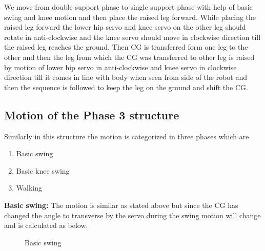 \documentclass[12pt]{article}
\begin{document}
We move from double support phase to single support phase with help of basic swing and
knee motion and then place the raised leg forward. While placing the raised leg forward
the lower hip servo and knee servo on the other leg should rotate in anti-clockwise and the
knee servo should move in clockwise direction till the raised leg reaches the ground. Then
CG is transferred form one leg to the other and then the leg from which the CG was
transferred to other leg is raised by motion of lower hip servo in anti-clockwise and knee
servo in clockwise direction till it comes in line with body when seen from side of the
robot and then the sequence is followed to keep the leg on the ground and shift the CG.
\vspace{3cm}

\subsection{Motion of the Phase 3 structure}
Similarly in this structure the motion is categorized in three phases which are
\begin{enumerate}
	\item Basic swing
	\item Basic knee swing
	\item Walking
\end{enumerate}
\newpage
\textbf{Basic swing:} The motion is similar as stated above but since the CG has changed the angle
to transverse by the servo during the swing motion will change and is calculated as below.
\begin{figure}[h!]
	
	\centering
	\hspace{2cm}
	\newline
	
	\caption{Basic swing}
\end{figure}
\end{document}
